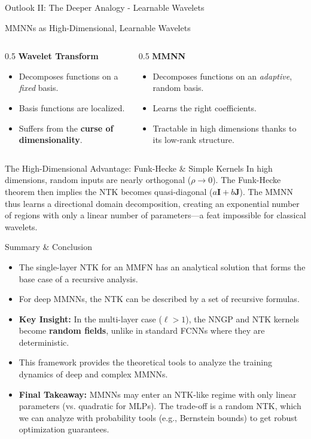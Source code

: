 \documentclass{beamer}
\begin{document}
\begin{frame}{Outlook II: The Deeper Analogy - Learnable Wavelets}
\begin{block}{MMNNs as High-Dimensional, Learnable Wavelets}
\end{block}
\begin{columns}[T]
    \begin{column}{0.5\textwidth}
        \textbf{Wavelet Transform}
        \begin{itemize}
            \item Decomposes functions on a \textit{fixed} basis.
            \item Basis functions are localized.
            \item Suffers from the \textbf{curse of dimensionality}.
        \end{itemize}
    \end{column}
    \begin{column}{0.5\textwidth}
        \textbf{MMNN}
        \begin{itemize}
            \item Decomposes functions on an \textit{adaptive}, random basis.
            \item Learns the right coefficients.
            \item Tractable in high dimensions thanks to its low-rank structure.
        \end{itemize}
    \end{column}
\end{columns}
\begin{alertblock}{The High-Dimensional Advantage: Funk-Hecke & Simple Kernels}
In high dimensions, random inputs are nearly orthogonal ($\rho \to 0$). The Funk-Hecke theorem then implies the NTK becomes quasi-diagonal ($a\mathbf{I}+b\mathbf{J}$). The MMNN thus learns a directional domain decomposition, creating an exponential number of regions with only a linear number of parameters—a feat impossible for classical wavelets.
\end{alertblock}
\end{frame}

\begin{frame}{Summary \& Conclusion}
\begin{itemize}
    \item The single-layer NTK for an MMFN has an analytical solution that forms the base case of a recursive analysis.
    \item For deep MMNNs, the NTK can be described by a set of recursive formulas.
    \item \textbf{Key Insight:} In the multi-layer case ($\ell > 1$), the NNGP and NTK kernels become \textbf{random fields}, unlike in standard FCNNs where they are deterministic.
    \item This framework provides the theoretical tools to analyze the training dynamics of deep and complex MMNNs.
    \item \textbf{Final Takeaway:} MMNNs may enter an NTK-like regime with only linear parameters (vs. quadratic for MLPs). The trade-off is a random NTK, which we can analyze with probability tools (e.g., Bernstein bounds) to get robust optimization guarantees.
\end{itemize}
\end{frame}
\end{document}
